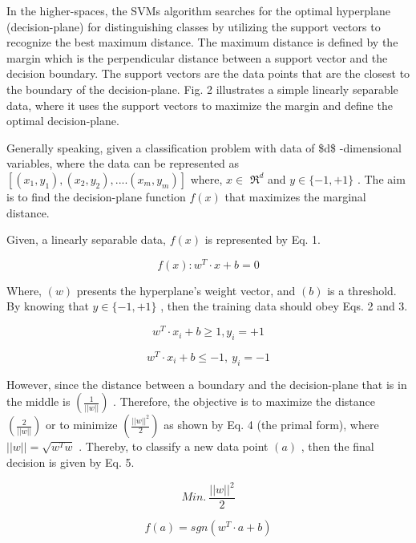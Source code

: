 In the higher-spaces, the SVMs algorithm searches for the optimal hyperplane (decision-plane) for distinguishing classes by utilizing the support vectors to recognize the best maximum distance. The maximum distance is defined by the margin which is the perpendicular distance between a support vector and the decision boundary. The support vectors are the data points that are the closest to the boundary of the decision-plane. Fig. 2 illustrates a simple linearly separable data, where it uses the support vectors to maximize the margin and define the optimal decision-plane.

Generally speaking, given a classification problem with data of \$d\$ -dimensional variables, where the data can be represented as $[(x_{1},y_{1}),(x_{2},y_{2}),....(x_{m},y_{m})]$ where, $x\in$ $\Re^{d}$ and $y\in\{-1,+1\}$ . The aim is to find the decision-plane function $f(x)$ that maximizes the marginal distance.

Given, a linearly separable data, $f(x)$ is represented by Eq. 1.

\begin{equation}
f(x):w^{T}\cdot x+b=0
\end{equation}

Where, $(w)$ presents the hyperplane’s weight vector, and $(b)$ is a threshold. By knowing that $y\in\{-1,+1\}$ , then the training data should obey Eqs. 2 and 3.

\begin{equation}
w^{T}\cdot x_{i}+b\geq1,y_{i}=+1
\end{equation}

\begin{equation}
w^{T}\cdot x_{i}+b\leq-1,~y_{i}=-1
\end{equation}

However, since the distance between a boundary and the decision-plane that is in the middle is $\left({\frac{1}{\left|\left|w\right|\right|}}\right)$ . Therefore, the objective is to maximize the distance $\left({\frac{2}{\left|\left|w\right|\right|}}\right)$ or to minimize $\left({\frac{||w||^{2}}{2}}\right)$ as shown by Eq. 4 (the primal form), where $||w||=\sqrt{w^{T}w}$ . Thereby, to classify a new data point $(a)$ , then the final decision is given by Eq. 5.

\begin{equation}
M i n.~\frac{||w||^{2}}{2}
\end{equation}

\begin{equation}
f(a)=s g n(w^{T}\cdot a+b)
\end{equation}

